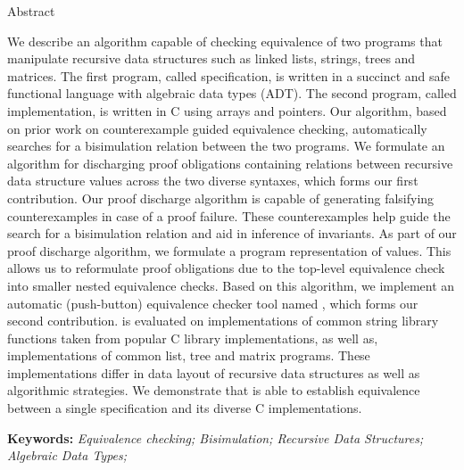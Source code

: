 \begin{center}

\LARGE{Abstract}
\end{center}
We describe an algorithm capable of checking
equivalence of two programs that manipulate recursive
data structures such as linked lists, strings, trees
and matrices. The first program, called specification,
is written in a succinct and safe functional language
with algebraic data types (ADT).
The second program, called implementation,
is written in C using arrays and pointers.
Our algorithm, based on prior work on
counterexample guided equivalence checking,
automatically searches for a bisimulation
relation between the two programs.
We formulate an algorithm for discharging
proof obligations containing relations
between recursive data structure values across
the two diverse syntaxes, which forms our first contribution.
Our proof discharge algorithm is capable
of generating falsifying counterexamples in case of
a proof failure.
These counterexamples help guide the search for a bisimulation relation
and aid in inference of invariants.
As part of our proof discharge algorithm,
we formulate a program representation of values.
This allows us to reformulate proof obligations
due to the top-level equivalence check
into smaller nested equivalence checks.
Based on this algorithm,
we implement an automatic (push-button) equivalence checker tool named \toolName{},
which forms our second contribution.
\toolName{} is evaluated on
implementations of common string library
functions taken from popular C library implementations,
as well as,
implementations of common list, tree and matrix programs.
These implementations differ in data layout
of recursive data structures as well as
algorithmic strategies.
We demonstrate that \toolName{} is able to establish equivalence
between a single specification and its diverse C implementations.


\textbf{Keywords:} \textit{Equivalence checking; Bisimulation; Recursive Data Structures; Algebraic Data Types;}

\setlength{\parindent}{1.0em}
